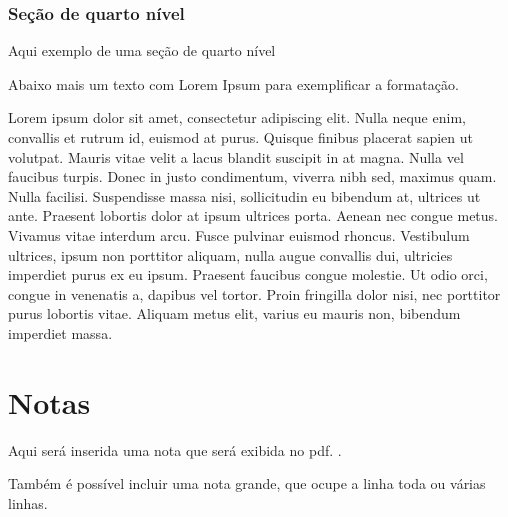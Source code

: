 \subsubsection{Seção de quarto nível}

Aqui exemplo de uma seção de quarto nível

Abaixo mais um texto com Lorem Ipsum para exemplificar a formatação.

Lorem ipsum dolor sit amet, consectetur adipiscing elit. Nulla neque enim, convallis et rutrum id, euismod at purus. Quisque finibus placerat sapien ut volutpat. Mauris vitae velit a lacus blandit suscipit in at magna. Nulla vel faucibus turpis. Donec in justo condimentum, viverra nibh sed, maximus quam. Nulla facilisi. Suspendisse massa nisi, sollicitudin eu bibendum at, ultrices ut ante. Praesent lobortis dolor at ipsum ultrices porta. Aenean nec congue metus. Vivamus vitae interdum arcu. Fusce pulvinar euismod rhoncus. Vestibulum ultrices, ipsum non porttitor aliquam, nulla augue convallis dui, ultricies imperdiet purus ex eu ipsum. Praesent faucibus congue molestie. Ut odio orci, congue in venenatis a, dapibus vel tortor. Proin fringilla dolor nisi, nec porttitor purus lobortis vitae. Aliquam metus elit, varius eu mauris non, bibendum imperdiet massa.

\section{Notas}

Aqui será inserida uma nota que será exibida no pdf. .

Também é possível incluir uma nota grande, que ocupe a linha toda ou várias linhas.


